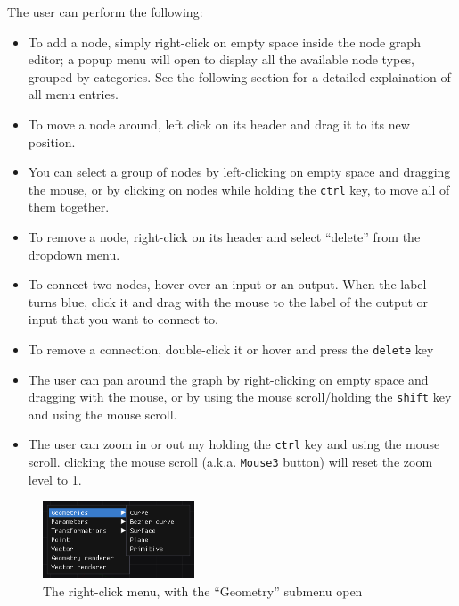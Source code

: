 The user can perform the following:
\begin{itemize}
    \item To add a node, simply right-click on empty space inside the node graph editor;
            a popup menu will open to display all the available node types, grouped by categories.
            See the following section for a detailed explaination of all menu entries.

    \item To move a node around, left click on its header and drag it to its new position.

    \item You can select a group of nodes by left-clicking on empty space and dragging the mouse,
            or by clicking on nodes while holding the \texttt{ctrl} key, to move all of them together.

    \item To remove a node, right-click on its header and select ``delete'' from the dropdown menu.

    \item To connect two nodes, hover over an input or an output. When the label turns blue, click it
            and drag with the mouse to the label of the output or input that you want to connect to. 

    \item To remove a connection, double-click it or hover and press the \texttt{delete} key

    \item The user can pan around the graph by right-clicking on empty space and dragging with the mouse,
            or by using the mouse scroll/holding the \texttt{shift} key and using the mouse scroll.

    \item The user can zoom in or out my holding the \texttt{ctrl} key and using the mouse scroll.
        clicking the mouse scroll (a.k.a. \texttt{Mouse3} button) will reset the zoom level to 1.

\end{itemize}

\begin{figure}[H]
\centering
\includegraphics[width=0.4\textwidth]{figures/right_click_popup.png}
\caption{\label{fig:rightclick_manu} The right-click menu, with the ``Geometry'' submenu open}
\end{figure}

